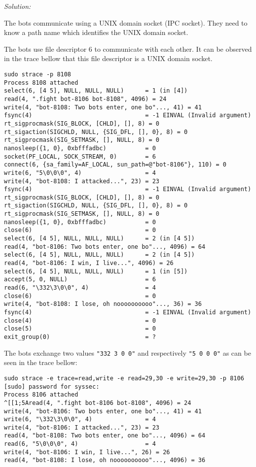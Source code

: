 \documentclass[a4paper,11pt]{article}
\newenvironment{solution}%
{\par{\noindent\small\textit{Solution:}}\vspace{-12pt}\begin{framed}}%
{\end{framed}\par}
\begin{document}
\ifsolution
\begin{solution}
The bots communicate using a UNIX domain socket (IPC socket). They need to know a path name which identifies the UNIX domain socket.

The bots use file descriptor 6 to communicate with each other. It can be observed in the trace bellow that this file descriptor is a UNIX domain socket.

\begin{lstlisting}
sudo strace -p 8108
Process 8108 attached
select(6, [4 5], NULL, NULL, NULL)      = 1 (in [4])
read(4, ".fight bot-8106 bot-8108", 4096) = 24
write(4, "bot-8108: Two bots enter, one bo"..., 41) = 41
fsync(4)                                = -1 EINVAL (Invalid argument)
rt_sigprocmask(SIG_BLOCK, [CHLD], [], 8) = 0
rt_sigaction(SIGCHLD, NULL, {SIG_DFL, [], 0}, 8) = 0
rt_sigprocmask(SIG_SETMASK, [], NULL, 8) = 0
nanosleep({1, 0}, 0xbfffadbc)           = 0
socket(PF_LOCAL, SOCK_STREAM, 0)        = 6
connect(6, {sa_family=AF_LOCAL, sun_path=@"bot-8106"}, 110) = 0
write(6, "5\0\0\0", 4)                  = 4
write(4, "bot-8108: I attacked...", 23) = 23
fsync(4)                                = -1 EINVAL (Invalid argument)
rt_sigprocmask(SIG_BLOCK, [CHLD], [], 8) = 0
rt_sigaction(SIGCHLD, NULL, {SIG_DFL, [], 0}, 8) = 0
rt_sigprocmask(SIG_SETMASK, [], NULL, 8) = 0
nanosleep({1, 0}, 0xbfffadbc)           = 0
close(6)                                = 0
select(6, [4 5], NULL, NULL, NULL)      = 2 (in [4 5])
read(4, "bot-8106: Two bots enter, one bo"..., 4096) = 64
select(6, [4 5], NULL, NULL, NULL)      = 2 (in [4 5])
read(4, "bot-8106: I win, I live...", 4096) = 26
select(6, [4 5], NULL, NULL, NULL)      = 1 (in [5])
accept(5, 0, NULL)                      = 6
read(6, "\332\3\0\0", 4)                = 4
close(6)                                = 0
write(4, "bot-8108: I lose, oh noooooooooo"..., 36) = 36
fsync(4)                                = -1 EINVAL (Invalid argument)
close(4)                                = 0
close(5)                                = 0
exit_group(0)                           = ?
\end{lstlisting}

The bots exchange two values \texttt{"332 3 0 0"} and respectively \texttt{"5 0 0 0"} as 
can be seen in the trace bellow:

\begin{lstlisting}
sudo strace -e trace=read,write -e read=29,30 -e write=29,30 -p 8106
[sudo] password for syssec: 
Process 8106 attached
^[[1;5Aread(4, ".fight bot-8106 bot-8108", 4096) = 24
write(4, "bot-8106: Two bots enter, one bo"..., 41) = 41
write(6, "\332\3\0\0", 4)               = 4
write(4, "bot-8106: I attacked...", 23) = 23
read(4, "bot-8108: Two bots enter, one bo"..., 4096) = 64
read(6, "5\0\0\0", 4)                   = 4
write(4, "bot-8106: I win, I live...", 26) = 26
read(4, "bot-8108: I lose, oh noooooooooo"..., 4096) = 36
\end{lstlisting}


\end{solution}
\end{document}
